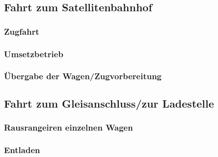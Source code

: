 \subsection{Fahrt zum Satellitenbahnhof}
\subsubsection{Zugfahrt}
\subsubsection{Umsetzbetrieb}
\subsubsection{Übergabe der Wagen/Zugvorbereitung}
\subsection{Fahrt zum Gleisanschluss/zur Ladestelle}
\subsubsection{Rausrangeiren einzelnen Wagen}
\subsubsection{Entladen}